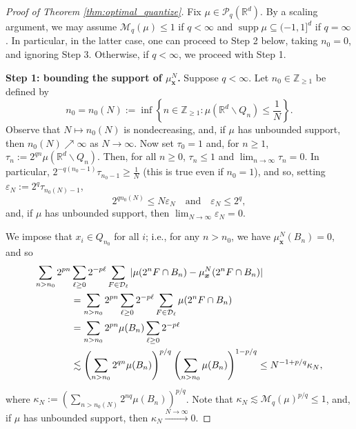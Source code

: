 \documentclass[11pt,reqno]{amsart}
\newcommand{\bx}{{\bm{x}}}
\theoremstyle{definition}
\def\bx{{\boldsymbol x}}
\newcommand{\bm}[1]{\boldsymbol #1}
\newcommand{\Rd}{{\mathbb{R}^d}}
\DeclareMathOperator{\supp}{supp}
\newcommand{\ZZ}{{\mathbb Z}}
\newcommand{\eps}{\varepsilon}
\newcommand{\mcl}{\mathcal}
\theoremstyle{definition}
\numberwithin{equation}{section}
\numberwithin{lemma}{section}
\numberwithin{proposition}{section}
\numberwithin{theorem}{section}
\numberwithin{corollary}{section}
\numberwithin{definition}{section}
\numberwithin{remark}{section}
\begin{document}
\begin{proof}[Proof of Theorem \ref{thm:optimal_quantize}]
	Fix $\mu \in \mcl P_q(\Rd)$. By a scaling argument, we may assume $\mcl M_q(\mu) \le 1$ if $q < \infty$ and $\supp \mu \subseteq (-1,1]^d$ if $q = \infty$. In particular, in the latter case, one can proceed to Step 2 below, taking $n_0 = 0$, and ignoring Step 3. Otherwise, if $q < \infty$, we proceed with Step 1.
    
    \textbf{Step 1: bounding the support of $\mu^N_\bx$.} Suppose $q < \infty$. Let $n_0 \in \ZZ_{\ge 1}$ be defined by
     \[
     	n_0 = n_0(N) := \inf\left\{ n \in \ZZ_{\ge 1} : \mu(\Rd \backslash Q_n) \le \frac{1}{N} \right\}.
     \]
	Observe that  $N \mapsto n_0(N)$ is nondecreasing, and, if $\mu$ has unbounded support, then $n_0(N) \nearrow \infty$ as $N \to \infty$. Now set $\tau_0 = 1$ and, for $n \ge 1$, $\tau_n := 2^{qn} \mu(\Rd \backslash Q_n)$. Then, for all $n \ge 0$, $\tau_n \le 1$ and $\lim_{n \to \infty} \tau_n = 0$. In particular, $2^{-q(n_0 - 1)} \tau_{n_0 - 1} \ge \frac{1}{N}$ (this is true even if $n_0 = 1$), and so, setting $\eps_N := 2^q\tau_{n_0(N) - 1}$, 
	\begin{equation}\label{exponent_of_n_0}
		2^{qn_0(N)} \le N \eps_N \quad \text{and} \quad \eps_N \le 2^q,
	\end{equation}
and, if $\mu$ has unbounded support, then $\lim_{N \to \infty} \eps_N = 0$.
     
     We impose that $x_i \in Q_{n_0}$ for all $i$; i.e., for any $n > n_0$, we have $\mu^N_{\bx}(B_n) = 0$, and so
	\begin{align}
		\sum_{n > n_0} 2^{pn}& \sum_{\ell \ge 0} 2^{-p\ell} \sum_{F \in \mcl D_\ell} |\mu(2^n F \cap B_n) - \mu^N_\bx(2^n F \cap B_n)| \notag \\
		&= \sum_{n > n_0} 2^{pn} \sum_{\ell \ge 0} 2^{-p\ell} \sum_{F \in \mcl D_\ell} \mu(2^n F \cap B_n) \notag \\
		&= \sum_{n > n_0} 2^{pn} \mu(B_n)\sum_{\ell \ge 0} 2^{-p \ell} \notag \\
		&\lesssim \left( \sum_{n > n_0} 2^{qn} \mu(B_n) \right)^{p/q} \left(\sum_{n > n_0} \mu(B_n) \right)^{1 - p/q} 
		\le N^{-1 + p/q} \kappa_N,
		\label{becauseofmoment_eps}
	\end{align}
	where $\kappa_N := \left( \sum_{n > n_0(N)} 2^{nq} \mu(B_n) \right)^{p/q}$.
    Note that $\kappa_N \lesssim \mcl M_q(\mu)^{p/q} \le 1$, and, if $\mu$ has unbounded support, then $\kappa_N \xrightarrow{N \to \infty} 0$.
	

\end{proof}
\end{document}
